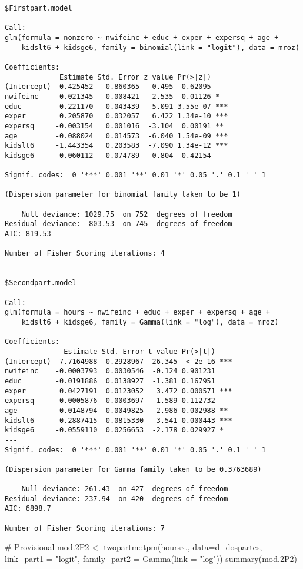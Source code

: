 \documentclass[
  letterpaper,
  DIV=11,
  numbers=noendperiod]{scrreprt}
\newenvironment{Shaded}{\begin{snugshade}}{\end{snugshade}}
\newcommand{\AttributeTok}[1]{\textcolor[rgb]{0.40,0.45,0.13}{#1}}
\newcommand{\CommentTok}[1]{\textcolor[rgb]{0.37,0.37,0.37}{#1}}
\newcommand{\FloatTok}[1]{\textcolor[rgb]{0.68,0.00,0.00}{#1}}
\newcommand{\FunctionTok}[1]{\textcolor[rgb]{0.28,0.35,0.67}{#1}}
\newcommand{\NormalTok}[1]{\textcolor[rgb]{0.00,0.23,0.31}{#1}}
\newcommand{\OtherTok}[1]{\textcolor[rgb]{0.00,0.23,0.31}{#1}}
\newcommand{\SpecialCharTok}[1]{\textcolor[rgb]{0.37,0.37,0.37}{#1}}
\newcommand{\StringTok}[1]{\textcolor[rgb]{0.13,0.47,0.30}{#1}}
\begin{document}
\begin{verbatim}
$Firstpart.model

Call:
glm(formula = nonzero ~ nwifeinc + educ + exper + expersq + age + 
    kidslt6 + kidsge6, family = binomial(link = "logit"), data = mroz)

Coefficients:
             Estimate Std. Error z value Pr(>|z|)    
(Intercept)  0.425452   0.860365   0.495  0.62095    
nwifeinc    -0.021345   0.008421  -2.535  0.01126 *  
educ         0.221170   0.043439   5.091 3.55e-07 ***
exper        0.205870   0.032057   6.422 1.34e-10 ***
expersq     -0.003154   0.001016  -3.104  0.00191 ** 
age         -0.088024   0.014573  -6.040 1.54e-09 ***
kidslt6     -1.443354   0.203583  -7.090 1.34e-12 ***
kidsge6      0.060112   0.074789   0.804  0.42154    
---
Signif. codes:  0 '***' 0.001 '**' 0.01 '*' 0.05 '.' 0.1 ' ' 1

(Dispersion parameter for binomial family taken to be 1)

    Null deviance: 1029.75  on 752  degrees of freedom
Residual deviance:  803.53  on 745  degrees of freedom
AIC: 819.53

Number of Fisher Scoring iterations: 4


$Secondpart.model

Call:
glm(formula = hours ~ nwifeinc + educ + exper + expersq + age + 
    kidslt6 + kidsge6, family = Gamma(link = "log"), data = mroz)

Coefficients:
              Estimate Std. Error t value Pr(>|t|)    
(Intercept)  7.7164988  0.2928967  26.345  < 2e-16 ***
nwifeinc    -0.0003793  0.0030546  -0.124 0.901231    
educ        -0.0191886  0.0138927  -1.381 0.167951    
exper        0.0427191  0.0123052   3.472 0.000571 ***
expersq     -0.0005876  0.0003697  -1.589 0.112732    
age         -0.0148794  0.0049825  -2.986 0.002988 ** 
kidslt6     -0.2887415  0.0815330  -3.541 0.000443 ***
kidsge6     -0.0559110  0.0256653  -2.178 0.029927 *  
---
Signif. codes:  0 '***' 0.001 '**' 0.01 '*' 0.05 '.' 0.1 ' ' 1

(Dispersion parameter for Gamma family taken to be 0.3763689)

    Null deviance: 261.43  on 427  degrees of freedom
Residual deviance: 237.94  on 420  degrees of freedom
AIC: 6898.7

Number of Fisher Scoring iterations: 7
\end{verbatim}

\begin{Shaded}
\begin{Highlighting}[]
\CommentTok{\# Provisional}
\NormalTok{mod}\FloatTok{.2}\NormalTok{P2 }\OtherTok{\textless{}{-}}\NormalTok{ twopartm}\SpecialCharTok{::}\FunctionTok{tpm}\NormalTok{(hours}\SpecialCharTok{\textasciitilde{}}\NormalTok{.,}
               \AttributeTok{data=}\NormalTok{d\_dospartes,}
               \AttributeTok{link\_part1 =} \StringTok{"logit"}\NormalTok{,}
               \AttributeTok{family\_part2 =} \FunctionTok{Gamma}\NormalTok{(}\AttributeTok{link =} \StringTok{"log"}\NormalTok{))}
\FunctionTok{summary}\NormalTok{(mod}\FloatTok{.2}\NormalTok{P2)}
\end{Highlighting}
\end{Shaded}
\end{document}
